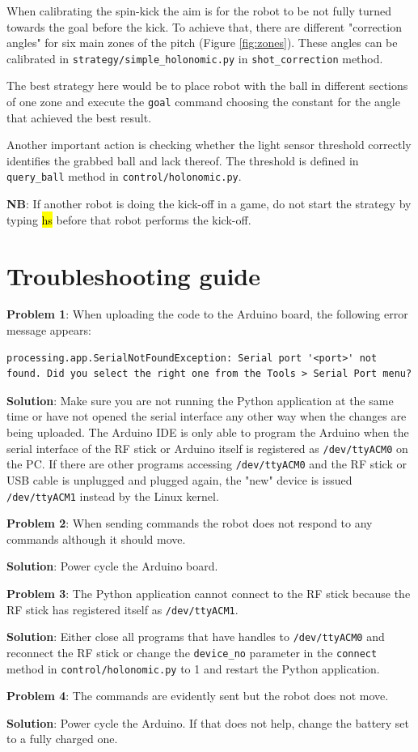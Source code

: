 \documentclass[a4paper,12pt]{article}
\newcommand{\hg}[1]{\hl{\ttfamily #1}}
\begin{document}
When calibrating the spin-kick the aim is for the robot to be not fully turned towards the goal before the kick. To achieve that, there are different "correction angles" for six main zones of the pitch (Figure  \ref{fig:zones}). These angles can be calibrated in \texttt{strategy/simple\_holonomic.py} in \texttt{shot\_correction} method. 

The best strategy here would be to place robot with the ball in different sections of one zone and execute the \texttt{goal} command choosing the constant for the angle that achieved the best result.

Another important action is checking whether the light sensor threshold correctly identifies the grabbed ball and lack thereof. The threshold is defined in \texttt{query\_ball} method in \texttt{control/holonomic.py}.

\textbf{NB}: If another robot is doing the kick-off in a game, do not start the strategy by typing \hg{hs} before that robot performs the kick-off.

\section{Troubleshooting guide}

\textbf{Problem 1}: When uploading the code to the Arduino board, the following error message appears:
\begin{lstlisting}
processing.app.SerialNotFoundException: Serial port '<port>' not found. Did you select the right one from the Tools > Serial Port menu?
\end{lstlisting}
\textbf{Solution}: Make sure you are not running the Python application at the same time or have not opened the serial interface any other way when the changes are being uploaded. The Arduino IDE is only able to program the Arduino when the serial interface of the RF stick or Arduino itself is registered as \texttt{/dev/ttyACM0} on the PC. If there are other programs accessing \texttt{/dev/ttyACM0} and the RF stick or USB cable is unplugged and plugged again, the "new" device is issued \texttt{/dev/ttyACM1} instead by the Linux kernel.

\textbf{Problem 2}: When sending commands the robot does not respond to any commands although it should move.

\textbf{Solution}: Power cycle the Arduino board.

\textbf{Problem 3}: The Python application cannot connect to the RF stick because the RF stick has registered itself as \texttt{/dev/ttyACM1}.

\textbf{Solution}: Either close all programs that have handles to \texttt{/dev/ttyACM0} and reconnect the RF stick or change the \texttt{device\_no} parameter in the \texttt{connect} method in \texttt{control/holonomic.py} to 1 and restart the Python application.

\textbf{Problem 4}: The commands are evidently sent but the robot does not move.

\textbf{Solution}: Power cycle the Arduino. If that does not help, change the battery set to a fully charged one.
\end{document}
